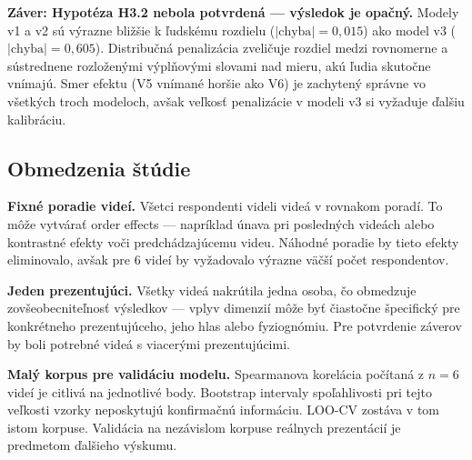 \textbf{Záver: Hypotéza H3.2 nebola potvrdená --- výsledok je opačný.} Modely v1 a v2 sú výrazne bližšie k ľudskému rozdielu ($|\text{chyba}| = 0{,}015$) ako model v3 ($|\text{chyba}| = 0{,}605$). Distribučná penalizácia zveličuje rozdiel medzi rovnomerne a sústrednene rozloženými výplňovými slovami nad mieru, akú ľudia skutočne vnímajú. Smer efektu (V5 vnímané horšie ako V6) je zachytený správne vo všetkých troch modeloch, avšak veľkosť penalizácie v modeli v3 si vyžaduje ďalšiu kalibráciu.

\subsection{Obmedzenia štúdie}

\textbf{Fixné poradie videí.} Všetci respondenti videli videá v rovnakom poradí. To môže vytvárať order effects --- napríklad únava pri posledných videách alebo kontrastné efekty voči predchádzajúcemu videu. Náhodné poradie by tieto efekty eliminovalo, avšak pre 6 videí by vyžadovalo výrazne väčší počet respondentov.

\textbf{Jeden prezentujúci.} Všetky videá nakrútila jedna osoba, čo obmedzuje zovšeobecniteľnosť výsledkov --- vplyv dimenzií môže byť čiastočne špecifický pre konkrétneho prezentujúceho, jeho hlas alebo fyziognómiu. Pre potvrdenie záverov by boli potrebné videá s viacerými prezentujúcimi.

\textbf{Malý korpus pre validáciu modelu.} Spearmanova korelácia počítaná z $n = 6$ videí je citlivá na jednotlivé body. Bootstrap intervaly spoľahlivosti pri tejto veľkosti vzorky neposkytujú konfirmačnú informáciu. LOO-CV zostáva v tom istom korpuse. Validácia na nezávislom korpuse reálnych prezentácií je predmetom ďalšieho výskumu.
